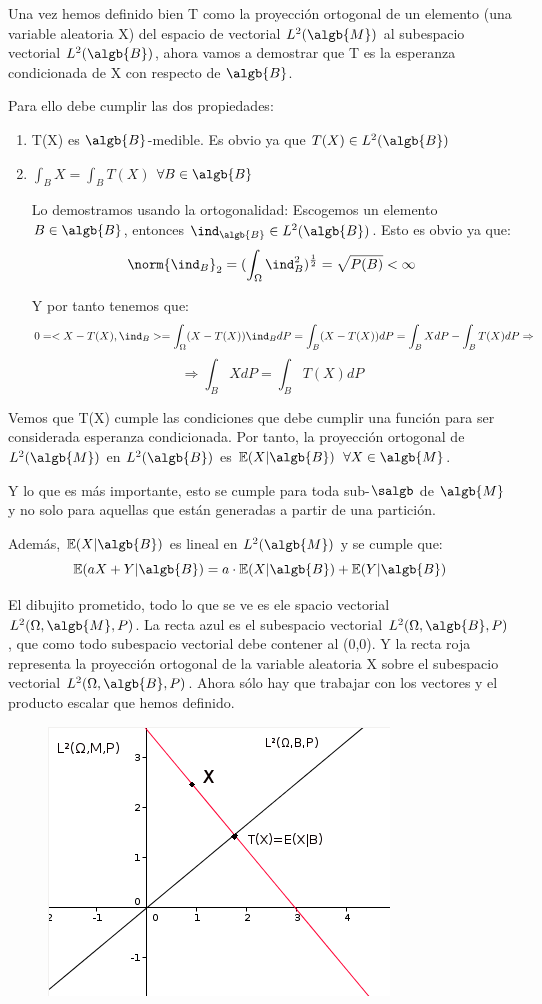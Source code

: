 \documentclass{apuntes}
\begin{document}
Una vez hemos definido bien T como la proyección ortogonal de un elemento (una variable aleatoria X) del espacio de vectorial $L^2(\algb{M})$ al subespacio vectorial $L^2(\algb{B})$, ahora vamos a demostrar que T es la esperanza condicionada de X con respecto de $\algb{B}$.

Para ello debe cumplir las dos propiedades:
\begin{enumerate}
\item T(X) es $\algb{B}$-medible. Es obvio ya que $T(X) \in L^2(\algb{B})$

\item $\int_B X =\int_B T(X)$  $\forall B \in \algb{B}$

Lo demostramos usando la ortogonalidad: Escogemos un elemento $B \in \algb{B}$, entonces $\ind_{\algb{B}} \in L^2(\algb{B})$. Esto es obvio ya que:
\[
\norm{\ind_B}_2=(\int_{\Omega}\ind_B^2)^{\frac{1}{2}}=\sqrt{P(B)}<\infty 
\]

Y por tanto tenemos que:
\[
0=<X-T(X),\ind_B> = \int_{\Omega}(X-T(X))\ind_B dP= \int_B(X-T(X)) dP= \int_B X dP - \int_B T(X) dP \Rightarrow
\]
\[
\Rightarrow \int_B X dP = \int_B T(X) dP
\]
\end{enumerate}

Vemos que T(X) cumple las condiciones que debe cumplir una función para ser considerada esperanza condicionada. Por tanto, la proyección ortogonal de $L^2(\algb{M})$ en $L^2(\algb{B})$ es $\mathbb{E}(X|\algb{B})$ $\forall X \in \algb{M}$.

Y lo que es más importante, esto se cumple para toda sub-$\salgb$ de $\algb{M}$ y no solo para aquellas que están generadas a partir de una partición.

Además, $\mathbb{E}(X|\algb{B})$ es lineal en $L^2(\algb{M})$ y se cumple que:
\[
\mathbb{E}(aX+Y|\algb{B})=a\cdot\mathbb{E}(X|\algb{B})+\mathbb{E}(Y|\algb{B})
\]

El dibujito prometido, todo lo que se ve es ele spacio vectorial $L^2(\Omega,\algb{M},P)$. La recta azul es el subespacio vectorial $L^2(\Omega,\algb{B},P)$, que como todo subespacio vectorial debe contener al (0,0). Y la recta roja representa la proyección ortogonal de la variable aleatoria X sobre el subespacio vectorial $L^2(\Omega,\algb{B},P)$. Ahora sólo hay que trabajar con los vectores y el producto escalar que hemos definido.
\begin{figure}[h]
\centering
\includegraphics[page=1,scale=0.745]{img/graf1.png}
\end{figure}
\end{document}
